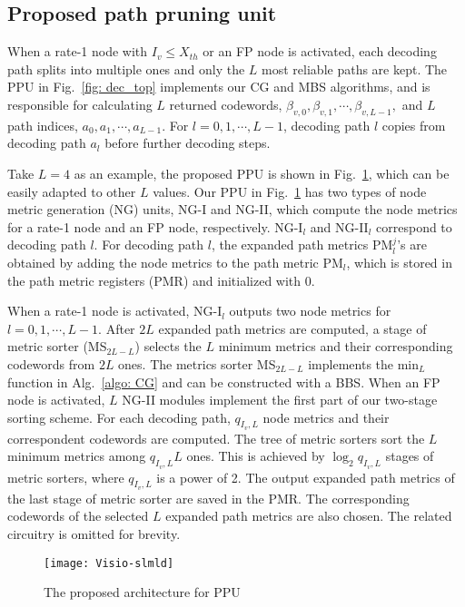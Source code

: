 \documentclass[journal]{IEEEtran}
\begin{document}
\subsection{Proposed path pruning unit} \label{ssec: slmld_archi}

When a rate-1 node with $I_v\leqslant X_{th}$ or an FP node is activated, each decoding path splits into multiple ones and only the $L$ most reliable paths are kept. The PPU in Fig.~\ref{fig: dec_top} implements our CG and MBS algorithms, and is responsible for calculating $L$ returned codewords, $\beta_{v,0}, \beta_{v,1},\cdots,\beta_{v,L-1},$ and $L$ path indices, $a_0, a_1,\cdots,a_{L-1}$. For $l=0,1,\cdots,L-1$, decoding path $l$ copies from decoding path $a_l$ before further decoding steps.


Take $L=4$ as an example, the proposed PPU is shown in Fig.~\ref{fig: slmld}, which can be easily adapted to other $L$ values. Our PPU in Fig.~\ref{fig: slmld} has two types of node metric generation (NG) units, NG-I and NG-II, which compute the node metrics for a rate-1 node and an FP node, respectively. NG-I$_l$ and NG-II$_l$ correspond to decoding path $l$.
For decoding path $l$, the expanded path metrics PM$_l^j$'s are obtained by adding the node metrics to the path metric PM$_l$, which is stored in the path metric registers (PMR) and initialized with 0.

When a rate-1 node is activated, NG-I$_l$ outputs two node metrics for $l=0,1,\cdots,L-1$. After $2L$ expanded path metrics are computed, a stage of metric sorter (MS$_{2L-L}$) selects the $L$ minimum metrics and their corresponding codewords from $2L$ ones. The metrics sorter MS$_{2L-L}$ implements the min$_L$ function in Alg.~\ref{algo: CG} and can be constructed with a BBS. When an FP node is activated, $L$ NG-II modules implement the first part of our two-stage sorting scheme. For each decoding path, $q_{I_v,L}$ node metrics and their correspondent codewords are computed. The tree of metric sorters sort the $L$ minimum metrics among $q_{I_v,L}L$ ones. This is achieved by $\log_2 q_{I_v,L}$ stages of metric sorters, where $q_{I_v,L}$ is a power of 2. The output expanded path metrics of the last stage of metric sorter are saved in the PMR. The corresponding codewords of the selected $L$ expanded path metrics are also chosen. The related circuitry is omitted for brevity.

\begin{figure} [hbt]
\centering
  \texttt{[image: Visio-slmld]}
  \caption{The proposed architecture for PPU}\label{fig: slmld}
\end{figure}
\end{document}

